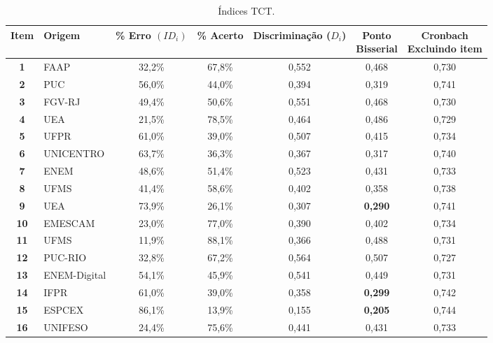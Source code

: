 \begin{table}[H]
	\centering
		\caption{Índices TCT.}
		\label{tabela-tct}
		\begin{tabular*}{\textwidth}{@{\extracolsep{\fill}}clccccc@{}}
			\toprule
			\textbf{Item} & \textbf{Origem} &
			 \makecell{\textbf{\% Erro} \\\textbf{ $(ID_i)$ }} & 
			 \makecell{\textbf{\% Acerto}\\}&
			  \makecell{\textbf{Discriminação} \\ \textbf{($D_i$)}} & \makecell{\textbf{Ponto} \\ \textbf{Bisserial}} & \makecell{\textbf{Cronbach} \\ \textbf{Excluindo item}} \\ 
\hline \textbf{1 }& FAAP & 32,2\% & 67,8\% & 0,552 & 0,468 & 0,730 \\ 
\hline \textbf{2 }& PUC & 56,0\% & 44,0\% & 0,394 & 0,319 & 0,741 \\ 
\hline \textbf{3 }& FGV-RJ & 49,4\% & 50,6\% & 0,551 & 0,468 & 0,730 \\ 
\hline \textbf{4 }& UEA & 21,5\% & 78,5\% & 0,464 & 0,486 & 0,729 \\ 
\hline \textbf{5 }& UFPR & 61,0\% & 39,0\% & 0,507 & 0,415 & 0,734 \\ 
\hline \textbf{6 }& UNICENTRO & 63,7\% & 36,3\% & 0,367 & 0,317 & 0,740 \\
\hline \textbf{7 }& ENEM & 48,6\% & 51,4\% & 0,523 & 0,431 & 0,733 \\ 
\hline \textbf{8 }& UFMS & 41,4\% & 58,6\% & 0,402 & 0,358 & 0,738 \\ 
\hline \textbf{9 }& UEA & 73,9\% & 26,1\% & 0,307 & \textbf{0,290} & 0,741 \\ 
\hline \textbf{10} & EMESCAM & 23,0\% & 77,0\% & 0,390 & 0,402 & 0,734 \\ 
\hline \textbf{11} & UFMS & 11,9\% & 88,1\% & 0,366 & 0,488 & 0,731 \\ 
\hline \textbf{12} & PUC-RIO & 32,8\% & 67,2\% & 0,564 & 0,507 & 0,727 \\ 
\hline \textbf{13} & ENEM-Digital & 54,1\% & 45,9\% & 0,541 & 0,449 & 0,731 \\ 
\hline \textbf{14} & IFPR & 61,0\% & 39,0\% & 0,358 & \textbf{0,299} & 0,742 \\ 
\hline \textbf{15} & ESPCEX & 86,1\% & 13,9\% & 0,155 & \textbf{0,205} & 0,744 \\ 
\hline \textbf{16} & UNIFESO & 24,4\% & 75,6\% & 0,441 & 0,431 & 0,733 \\ 

\end{tabular*}
\end{table}
